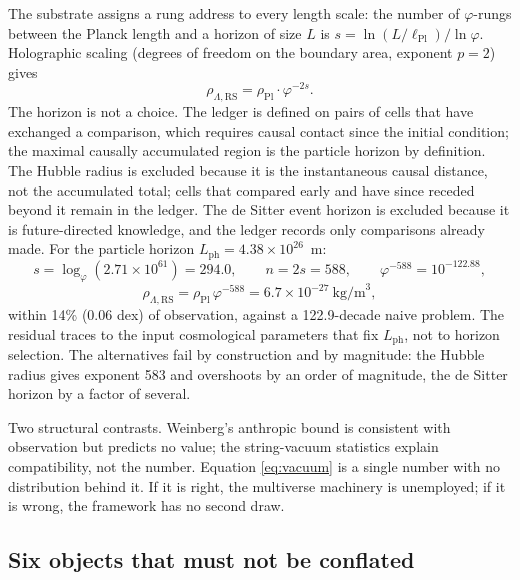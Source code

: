 \documentclass[11pt,letterpaper]{article}
\theoremstyle{definition}
\newcommand{\phiG}{\varphi}
\newcommand{\RS}{\mathrm{RS}}
\newcommand{\Pl}{\mathrm{Pl}}
\begin{document}
The substrate assigns a rung address to every length scale: the number
of $\phiG$-rungs between the Planck length and a horizon of size $L$ is
$s=\ln(L/\ell_\Pl)/\ln\phiG$.  Holographic scaling (degrees of freedom
on the boundary area, exponent $p=2$) gives
\begin{equation}\label{eq:rho-suppression}
\rho_{\Lambda,\RS}=\rho_\Pl\cdot\phiG^{-2s}.
\end{equation}
The horizon is not a choice.  The ledger is defined on pairs of cells
that have exchanged a comparison, which requires causal contact since
the initial condition; the maximal causally accumulated region is the
particle horizon by definition.  The Hubble radius is excluded because
it is the instantaneous causal distance, not the accumulated total;
cells that compared early and have since receded beyond it remain in
the ledger.  The de Sitter event horizon is excluded because it is
future-directed knowledge, and the ledger records only comparisons
already made.  For the particle horizon
$L_{\mathrm{ph}}=4.38\times10^{26}$~m:
\begin{equation}
s=\log_\phiG(2.71\times10^{61})=294.0,\qquad
n=2s=588,\qquad
\phiG^{-588}=10^{-122.88},
\end{equation}
\begin{equation}\label{eq:vacuum}
\rho_{\Lambda,\RS}=\rho_\Pl\,\phiG^{-588}
=6.7\times10^{-27}\ \text{kg/m}^3,
\end{equation}
within 14\% (0.06 dex) of observation, against a 122.9-decade naive
problem.  The residual traces to the input cosmological parameters
that fix $L_{\mathrm{ph}}$, not to horizon selection.  The alternatives
fail by construction and by magnitude: the Hubble radius gives
exponent 583 and overshoots by an order of magnitude, the de Sitter
horizon by a factor of several.

Two structural contrasts.  Weinberg's anthropic bound is consistent
with observation but predicts no value; the string-vacuum statistics
explain compatibility, not the number.  Equation \eqref{eq:vacuum} is
a single number with no distribution behind it.  If it is right, the
multiverse machinery is unemployed; if it is wrong, the framework has
no second draw.

\subsection{Six objects that must not be conflated}
\label{sec:eos}
\end{document}
